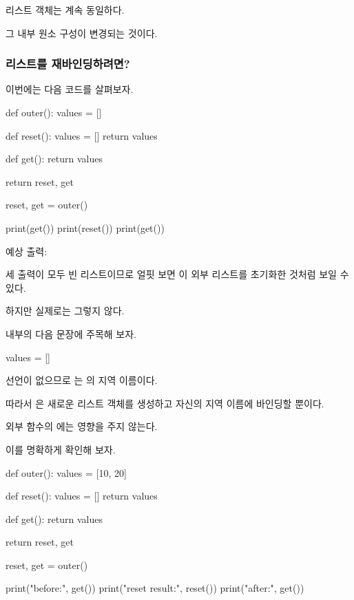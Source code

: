 리스트 객체는 계속 동일하다.

그 내부 원소 구성이 변경되는 것이다.

\subsubsection{리스트를 재바인딩하려면?}

이번에는 다음 코드를 살펴보자.

\begin{dhkcode}
def outer():
    values = []

    def reset():
        values = []
        return values

    def get():
        return values

    return reset, get


reset, get = outer()

print(get())
print(reset())
print(get())
\end{dhkcode}

예상 출력:

\begin{dhkzsh}
[]
[]
[]
\end{dhkzsh}

세 출력이 모두 빈 리스트이므로 얼핏 보면 이 외부 리스트를 초기화한 것처럼 보일 수 있다.

하지만 실제로는 그렇지 않다.

 내부의 다음 문장에 주목해 보자.

\begin{dhkcode}
values = []
\end{dhkcode}

 선언이 없으므로 는 의 지역 이름이다.

따라서 은 새로운 리스트 객체를 생성하고 자신의 지역 이름에 바인딩할 뿐이다.

외부 함수의 에는 영향을 주지 않는다.

이를 명확하게 확인해 보자.

\begin{dhkcode}
def outer():
    values = [10, 20]

    def reset():
        values = []
        return values

    def get():
        return values

    return reset, get


reset, get = outer()

print("before:", get())
print("reset result:", reset())
print("after:", get())
\end{dhkcode}

